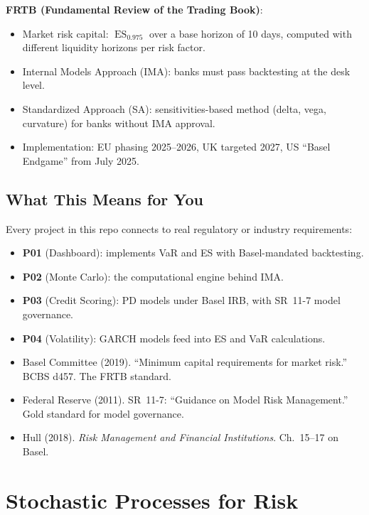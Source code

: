 \documentclass[11pt, a4paper]{article}
\theoremstyle{definition}
\theoremstyle{plain}
\theoremstyle{remark}
\newcommand{\ES}{\operatorname{ES}}
\begin{document}
\textbf{FRTB (Fundamental Review of the Trading Book)}:
\begin{itemize}
    \item Market risk capital: $\ES_{0.975}$ over a base horizon of 10 days, computed with different liquidity horizons per risk factor.
    \item Internal Models Approach (IMA): banks must pass backtesting at the desk level.
    \item Standardized Approach (SA): sensitivities-based method (delta, vega, curvature) for banks without IMA approval.
    \item Implementation: EU phasing 2025--2026, UK targeted 2027, US ``Basel Endgame'' from July 2025.
\end{itemize}

\subsection{What This Means for You}

Every project in this repo connects to real regulatory or industry requirements:
\begin{itemize}
    \item \textbf{P01} (Dashboard): implements VaR and ES with Basel-mandated backtesting.
    \item \textbf{P02} (Monte Carlo): the computational engine behind IMA.
    \item \textbf{P03} (Credit Scoring): PD models under Basel IRB, with SR~11-7 model governance.
    \item \textbf{P04} (Volatility): GARCH models feed into ES and VaR calculations.
\end{itemize}

\begin{refbox}
\begin{itemize}
    \item Basel Committee (2019). ``Minimum capital requirements for market risk.'' BCBS d457. The FRTB standard.
    \item Federal Reserve (2011). SR~11-7: ``Guidance on Model Risk Management.'' Gold standard for model governance.
    \item Hull (2018). \emph{Risk Management and Financial Institutions}. Ch.~15--17 on Basel.
\end{itemize}
\end{refbox}

\section{Stochastic Processes for Risk}
\end{document}
